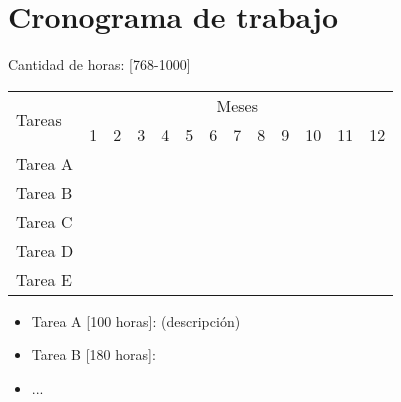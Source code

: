 \chapter{Cronograma de trabajo}

Cantidad de horas: [768-1000]

\bigskip

\begin{center}
    \def\arraystretch{1.5}
    \begin{tabular}{ |l|c|c|c|c|c|c|c|c|c|c|c|c| }

        \hline
        \multirow{2}{1em}{Tareas} & \multicolumn{12}{|c|}{Meses}                                                                                                                                                                      \\  \cline{2-13} &
        1                         & 2                            & 3                & 4                & 5                & 6                & 7                & 8 & 9 & 10 & 11               & 12                                  \\  \hline
        Tarea A                   & \cellcolor{gray}             & \cellcolor{gray} &                  &                  &                  &                  &   &   &    &                  &                  &                  \\
        \hline
        Tarea B                   &                              & \cellcolor{gray} & \cellcolor{gray} &                  &                  &                  &   &   &    &                  &                  &                  \\
        \hline
        Tarea C                   &                              & \cellcolor{gray} & \cellcolor{gray} & \cellcolor{gray} & \cellcolor{gray} & \cellcolor{gray} &   &   &    &                  &                  &                  \\
        \hline
        Tarea D                   &                              &                  &                  &                  &                  &                  &   &   &    &                  &                  &                  \\
        \hline
        Tarea E                   &                              &                  &                  &                  &                  &                  &   &   &    & \cellcolor{gray} & \cellcolor{gray} & \cellcolor{gray} \\
        \hline
    \end{tabular}
\end{center}

\bigskip

\begin{itemize}
    \item Tarea A [100 horas]: (descripción)
    \item Tarea B [180 horas]:
    \item ...
\end{itemize}

\bigskip